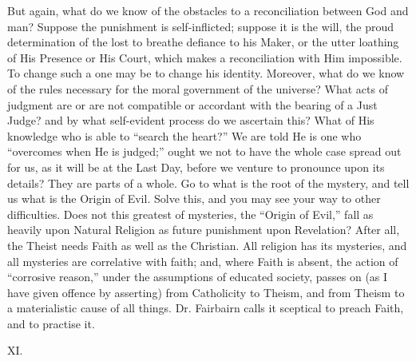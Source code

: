But again, what do we know of the obstacles to a reconciliation
between God and man? Suppose the punishment is self-inflicted; suppose
it is the will, the proud determination of the lost to breathe
defiance to his Maker, or the utter loathing of His Presence or His
Court, which makes a reconciliation with Him impossible. To change
such a one may be to change his identity. Moreover, what do we know of the rules necessary for the moral government of the universe?
What acts of judgment are or are not compatible or accordant with the
bearing of a Just Judge? and by what self-evident process do we
ascertain this? What of His knowledge who is able to ``search the
heart?'' We are told He is one who ``overcomes when He is
judged;'' ought we not to have the whole case spread out for us,
as it will be at the Last Day, before we venture to pronounce upon its
details? They are parts of a whole. Go to what is the root of the
mystery, and tell us what is the Origin of Evil. Solve this, and you
may see your way to other difficulties. Does not this greatest of
mysteries, the ``Origin of Evil,'' fall as heavily upon
Natural Religion as future punishment upon Revelation? After all, the
Theist needs Faith as well as the Christian. All religion has its
mysteries, and all mysteries are correlative with faith; and, where
Faith is absent, the action of ``corrosive reason,'' under the
assumptions of educated society, passes on (as I have given offence by
asserting) from Catholicity to Theism, and from Theism to a
materialistic cause of all things. Dr. Fairbairn calls it sceptical to
preach Faith, and to practise it.

XI.

